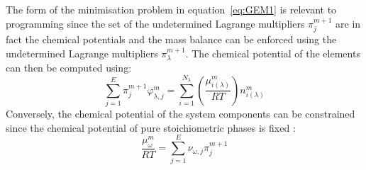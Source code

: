 	The  form of the minimisation problem in equation~\eqref{eq:GEM1} is relevant to programming since the set of the undetermined Lagrange multipliers $\pi_{j}^{m+1}$ are in fact the chemical potentials and the mass balance can be enforced using the undetermined Lagrange multipliers $\pi_{\lambda}^{m+1}$. The chemical potential of the elements can then be computed using:
	\begin{equation}\label{eq:GEM2}
		\sum_{j=1}^{E} \pi_{j}^{m+1} \varphi_{\lambda,j}^{m} = \sum_{i=1}^{N_\lambda} \left(\frac{\mu_{i(\lambda)}^{m}}{RT}\right)n_{i(\lambda)}^{m}
	\end{equation}
	 Conversely, the chemical potential of the system components can be constrained since the chemical potential of pure stoichiometric phases is fixed \cite{Piro11b}:
	 \begin{equation}\label{eq:GEM3}
		\frac{\mu_{\omega}^{m}}{RT} = \sum_{j=1}^{E} \nu_{\omega,j} \pi_{j}^{m+1} 
	\end{equation}
	
